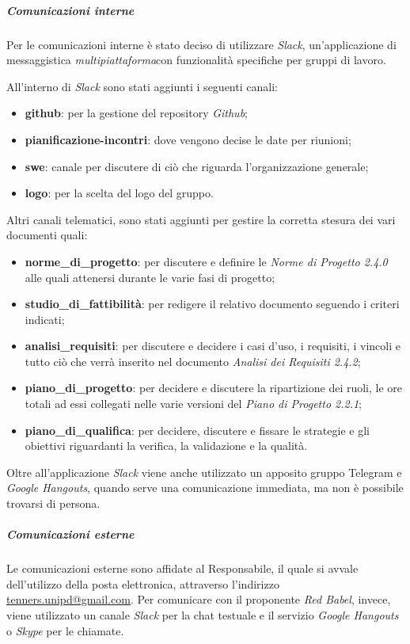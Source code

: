    		\subparagraph*{Comunicazioni interne}
   		Per le comunicazioni interne è stato deciso di utilizzare \textit{ Slack\glos}, un'applicazione di messaggistica \textit{multipiattaforma}\glo con funzionalità specifiche per gruppi di lavoro. 
   		
   		\noindent All'interno di \textit{Slack\glo} sono stati aggiunti i seguenti canali:
   		\begin{itemize}
   			\item \textbf{github}: per la gestione del repository \textit{Github\glos};
   			\item \textbf{pianificazione-incontri}: dove vengono decise le date per riunioni;
   			\item \textbf{swe}: canale per discutere di ciò che riguarda l'organizzazione generale;
   			\item \textbf{logo}: per la scelta del logo del gruppo.
   			
   		\end{itemize}
   		Altri canali telematici, sono stati aggiunti per gestire la corretta stesura dei vari documenti quali:
   		\begin{itemize}
   			\item \textbf{norme\_di\_progetto}: per discutere e definire le \textit{Norme di Progetto 2.4.0\doc} alle quali attenersi durante le varie fasi di progetto;
   			\item \textbf{studio\_di\_fattibilità}: per redigere il relativo documento seguendo i criteri indicati;
   			\item \textbf{analisi\_requisiti}: per discutere e decidere i casi d'uso, i requisiti, i vincoli e tutto ciò che verrà inserito nel documento \textit{Analisi dei Requisiti 2.4.2\docs};
   			\item \textbf{piano\_di\_progetto}: per decidere e discutere la ripartizione dei ruoli, le ore totali ad essi collegati nelle varie versioni del \textit{Piano di Progetto 2.2.1\docs};
   			\item \textbf{piano\_di\_qualifica}: per decidere, discutere e fissare le strategie e gli obiettivi riguardanti la verifica, la validazione e la qualità.
   		\end{itemize}
   		Oltre all'applicazione \textit{Slack\glo} viene anche utilizzato un apposito gruppo Telegram e \textit{Google Hangouts\glo}, quando serve una comunicazione immediata, ma non è possibile trovarsi di persona.
   		
   		\subparagraph*{Comunicazioni esterne}
   		Le comunicazioni esterne sono affidate al Responsabile, il quale si avvale dell'utilizzo della posta elettronica, attraverso l'indirizzo \href{mailto:tenners.unipd@gmail.com}{tenners.unipd@gmail.com}.
   		Per comunicare con il proponente \textit{Red Babel}, invece, viene utilizzato un canale \textit{Slack\glo} per la chat testuale e il servizio \textit{Google Hangouts\glos} o \textit{Skype\glo} per le chiamate. 
   		
